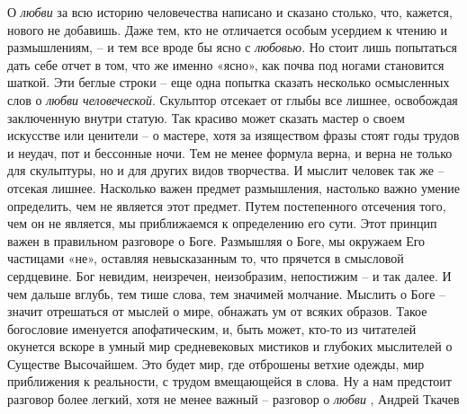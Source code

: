 О \emph{любви} за всю историю человечества написано и сказано столько, что, кажется,
нового не добавишь. Даже тем, кто не отличается особым усердием к чтению и
размышлениям, – и тем все вроде бы ясно с \emph{любовью}. Но стоит лишь попытаться
дать себе отчет в том, что же именно «ясно», как почва под ногами становится
шаткой.  Эти беглые строки – еще одна попытка сказать несколько осмысленных
слов о \emph{любви человеческой}.  Скульптор отсекает от глыбы все лишнее, освобождая
заключенную внутри статую.  Так красиво может сказать мастер о своем искусстве
или ценители – о мастере, хотя за изяществом фразы стоят годы трудов и неудач,
пот и бессонные ночи. Тем не менее формула верна, и верна не только для
скульптуры, но и для других видов творчества. И мыслит человек так же – отсекая
лишнее.  Насколько важен предмет размышления, настолько важно умение
определить, чем не является этот предмет. Путем постепенного отсечения того,
чем он не является, мы приближаемся к определению его сути.  Этот принцип важен
в правильном разговоре о Боге. Размышляя о Боге, мы окружаем Его частицами
«не», оставляя невысказанным то, что прячется в смысловой сердцевине. Бог
невидим, неизречен, неизобразим, непостижим – и так далее. И чем дальше вглубь,
тем тише слова, тем значимей молчание.  Мыслить о Боге – значит отрешаться от
мыслей о мире, обнажать ум от всяких образов. Такое богословие именуется
апофатическим, и, быть может, кто-то из читателей окунется вскоре в умный мир
средневековых мистиков и глубоких мыслителей о Существе Высочайшем. Это будет
мир, где отброшены ветхие одежды, мир приближения к реальности, с трудом
вмещающейся в слова.  Ну а нам предстоит разговор более легкий, хотя не менее
важный – разговор о \emph{любви}
, Андрей Ткачев
